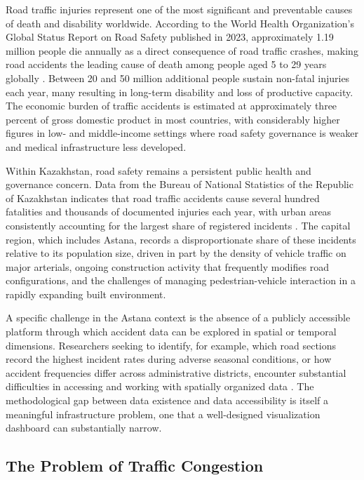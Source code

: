 \documentclass[12pt,a4paper]{report}
\begin{document}
Road traffic injuries represent one of the most significant and
preventable causes of death and disability worldwide. According to the
World Health Organization's Global Status Report on Road Safety
published in 2023, approximately 1.19 million people die annually as a
direct consequence of road traffic crashes, making road accidents the
leading cause of death among people aged 5 to 29 years globally
\cite{who2023}. Between 20 and 50 million additional people sustain
non-fatal injuries each year, many resulting in long-term disability
and loss of productive capacity. The economic burden of traffic
accidents is estimated at approximately three percent of gross domestic
product in most countries, with considerably higher figures in
low- and middle-income settings where road safety governance is weaker
and medical infrastructure less developed.

Within Kazakhstan, road safety remains a persistent public health and
governance concern. Data from the Bureau of National Statistics of the
Republic of Kazakhstan indicates that road traffic accidents cause
several hundred fatalities and thousands of documented injuries each
year, with urban areas consistently accounting for the largest share of
registered incidents \cite{kzstat2023}. The capital region, which
includes Astana, records a disproportionate share of these incidents
relative to its population size, driven in part by the density of
vehicle traffic on major arterials, ongoing construction activity that
frequently modifies road configurations, and the challenges of
managing pedestrian-vehicle interaction in a rapidly expanding built
environment.

A specific challenge in the Astana context is the absence of a
publicly accessible platform through which accident data can be
explored in spatial or temporal dimensions. Researchers seeking to
identify, for example, which road sections record the highest incident
rates during adverse seasonal conditions, or how accident frequencies
differ across administrative districts, encounter substantial
difficulties in accessing and working with spatially organized data
\cite{endashaw2025, salameh2024}. The methodological gap between
data existence and data accessibility is itself a meaningful
infrastructure problem, one that a well-designed visualization
dashboard can substantially narrow.

\subsection{The Problem of Traffic Congestion}
\end{document}
